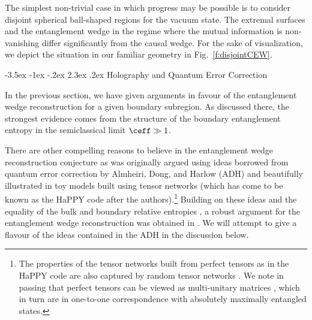 \documentclass[12pt,openany]{book}
\makeatletter
\renewcommand\section{\@startsection {section}{1}{\z@}%
                                   {-3.5ex \@plus -1ex \@minus -.2ex}%
                                   {2.3ex \@plus.2ex}%
                                   {\normalfont\large\bfseries}}
\makeatother
\begin{document}
The simplest non-trivial case in which progress may be possible is to consider disjoint spherical ball-shaped regions for the vacuum state. The extremal surfaces and the entanglement wedge in the regime where the mutual information is non-vanishing differ significantly from the causal wedge. For the sake of visualization, we depict the situation in our familiar  geometry in Fig.~\ref{f:disjointCEW}.





\section{Holography and Quantum Error Correction}
\label{sec:errors}

In the previous section, we have given arguments in favour of the entanglement wedge reconstruction for a given boundary subregion. As discussed there, the strongest evidence comes from the structure of the boundary entanglement entropy in the semiclassical limit $\ceff \gg 1$.

There are other compelling reasons to believe in the entanglement wedge reconstruction conjecture as was originally  argued using ideas borrowed from quantum error correction  by Almheiri, Dong, and Harlow (ADH) \cite{Almheiri:2014lwa} and beautifully illustrated in toy models built using tensor networks \cite{Pastawski:2015qua} (which has come to be known as the HaPPY code after the authors).\footnote{ The properties of the tensor networks built from perfect tensors as in the HaPPY code are also captured by random tensor networks \cite{Hayden:2016cfa}. We note in passing that perfect tensors can be viewed as multi-unitary matrices \cite{Goyeneche:2015aa}, which in turn are in one-to-one correspondence with absolutely maximally entangled states. } 
  Building on these ideas and the equality of the bulk and boundary relative entropies  \cite{Jafferis:2015del}, a robust argument for the entanglement wedge reconstruction was obtained in \cite{Dong:2016eik}. We will attempt to give a flavour of the ideas contained in the ADH in the discussion below.
\end{document}
